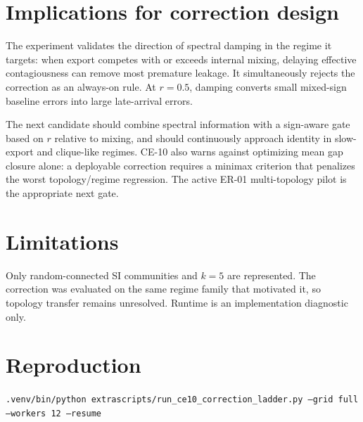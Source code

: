 \documentclass[11pt,a4paper]{article}
\begin{document}
\section{Implications for correction design}
The experiment validates the direction of spectral damping in the regime it targets: when export competes with or exceeds internal mixing, delaying effective contagiousness can remove most premature leakage. It simultaneously rejects the correction as an always-on rule. At $r=0.5$, damping converts small mixed-sign baseline errors into large late-arrival errors.

The next candidate should combine spectral information with a sign-aware gate based on $r$ relative to mixing, and should continuously approach identity in slow-export and clique-like regimes. CE-10 also warns against optimizing mean gap closure alone: a deployable correction requires a minimax criterion that penalizes the worst topology/regime regression. The active ER-01 multi-topology pilot is the appropriate next gate.

\section{Limitations}
Only random-connected SI communities and $k=5$ are represented. The correction was evaluated on the same regime family that motivated it, so topology transfer remains unresolved. Runtime is an implementation diagnostic only.
\section*{Reproduction}
\texttt{.venv/bin/python extrascripts/run\_ce10\_correction\_ladder.py --grid full --workers 12 --resume}
\end{document}
